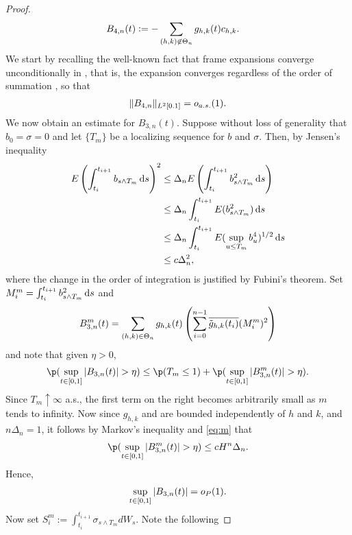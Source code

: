 \begin{proof}
\begin{align}
  &B_{4,n}(t) := - \sum_{\substack{(h,k) \not\in \Theta_n }}g_{h,k}(t){c}_{h,k}. 
  \label{}
\end{align}
We start by recalling the well-known fact that  frame expansions converge unconditionally in \Ltwo, that is, the expansion converges regardless of the order of summation \citep[Theorem 5.1.7]{Christensen2008}, so that  
\begin{align}
  \Vert B_{4, n}  \Vert_{L^2[0.1]} = o_{a.s.}(1).\notag
  \label{}
\end{align}
We now obtain an estimate for  $B_{3,n}(t)$. Suppose without loss of generality that $b_0 = \sigma =  0$ and let $\{T_m\}$ be a localizing sequence for $b$ and $\sigma$.  Then, by Jensen's inequality
\begin{align}
 E\left(\int_{t_i}^{t_{i+1}} b_{s \wedge T_m}  \D s\right)^2  &\le \Delta_n E\left(\int_{t_i}^{t_{i+1}} b_{s \wedge T_m}^2  \D s\right) \notag \\
&\le \Delta_n \int_{t_i}^{t_{i+1}} E(b_{s \wedge T_m}^2)  \D s \notag\\
&\le \Delta_n \int_{t_i}^{t_{i+1}} E(\sup_{u \le T_m}b_{u}^4)^{1/2}  \D s \notag\\
& \le c \Delta_n^2,
  \label{eq:m}
\end{align}
where the change in the order of integration is justified by Fubini's theorem.  Set $M_i^m = \int_{t_i}^{t_{i+1}} b_{s \wedge T_m}^2  \D s$ and 
\begin{align}
  B^m_{3,n}(t) = \sum_{(h,k) \in \Theta_n} g_{h,k}(t)\left( \sum_{i=0}^{n-1} \overline{\tilde{g}_{h,k}(t_i)} (M_i^m)^2 \right)\notag
  \label{}
\end{align}
and note that given $\eta > 0$,
\begin{align}
 \p(\sup_{t \in \domain} \vert B_{3,n}(t)\vert >  \eta ) \le \p(T_m \le 1) + \p( \sup_{t \in \domain} \vert B_{3,n}^m(t)\vert > \eta). \notag
  \label{}
\end{align}
Since $T_m \uparrow \infty$ a.s., the first term on the right becomes arbitrarily small as $m$ tends to infinity. Now since  $g_{h,k}$ and \tghk  are bounded independently of $h$ and $k$, and $n\Delta_n = 1$, it follows by Markov's inequality and \eqref{eq:m} that 
\begin{align}
  \p( \sup_{t \in \domain} \vert B_{3,n}^m(t)\vert > \eta) \le  c H^n \Delta_n.  \notag
  \label{}
\end{align}
Hence,
\begin{align}
  \sup_{t \in [0,1]} \vert B_{3,n}(t)\vert = o_{P}( 1).
  \label{}
\end{align}
Now set $S_i^m := \int_{t_i}^{t_{i + 1}} \sigma_{s \wedge T_m} d W_s$. Note the following  

\end{proof}
